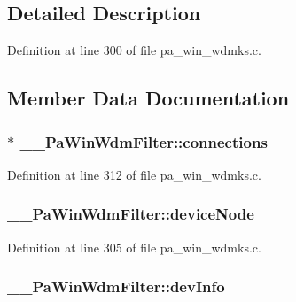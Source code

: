 \subsection{Detailed Description}


Definition at line 300 of file pa\+\_\+win\+\_\+wdmks.\+c.



\subsection{Member Data Documentation}
\subsubsection[{\texorpdfstring{connections}{connections}}]{$\ast$ \+\_\+\+\_\+\+Pa\+Win\+Wdm\+Filter\+::connections}\hypertarget{struct_____pa_win_wdm_filter_acb2256419c942e072c17068bbe5dca8f}{}\label{struct_____pa_win_wdm_filter_acb2256419c942e072c17068bbe5dca8f}


Definition at line 312 of file pa\+\_\+win\+\_\+wdmks.\+c.

\subsubsection[{\texorpdfstring{device\+Node}{deviceNode}}]{ \+\_\+\+\_\+\+Pa\+Win\+Wdm\+Filter\+::device\+Node}\hypertarget{struct_____pa_win_wdm_filter_a105c3a8f9cc3b7be4c7c0441c02dfa88}{}\label{struct_____pa_win_wdm_filter_a105c3a8f9cc3b7be4c7c0441c02dfa88}


Definition at line 305 of file pa\+\_\+win\+\_\+wdmks.\+c.

\subsubsection[{\texorpdfstring{dev\+Info}{devInfo}}]{ \+\_\+\+\_\+\+Pa\+Win\+Wdm\+Filter\+::dev\+Info}\hypertarget{struct_____pa_win_wdm_filter_a038e392b8dc260bd959dc1d9eaaa6a32}{}\label{struct_____pa_win_wdm_filter_a038e392b8dc260bd959dc1d9eaaa6a32}


